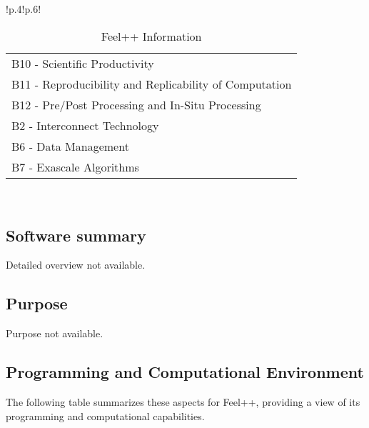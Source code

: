 \begin{table}[h!]
{{\begin{tabular}{!{\color{numpexgray}\vrule}p{.4\textwidth}!{\color{numpexgray}\vrule}p{.6\textwidth}!{\color{numpexgray}\vrule}}
\begin{tabular}{l}
B10 - Scientific Productivity\\
B11 - Reproducibility and Replicability of Computation\\
B12 - Pre/Post Processing and In-Situ Processing\\
B2 - Interconnect Technology\\
B6 - Data Management\\
B7 - Exascale Algorithms\\
\end{tabular} \\
        \bottomrule
    \end{tabular}
    }}
    \caption{Feel++ Information}
\end{table}

\subsection{Software summary}
\label{sec:Feel++:summary}
Detailed overview not available.



\subsection{Purpose}
\label{sec:Feel++:purpose}
Purpose not available.

\subsection{Programming and Computational Environment}
\label{sec::Feel++:environment_capabilities}


The following table summarizes these aspects for Feel++, providing a  view of its programming and computational capabilities.

